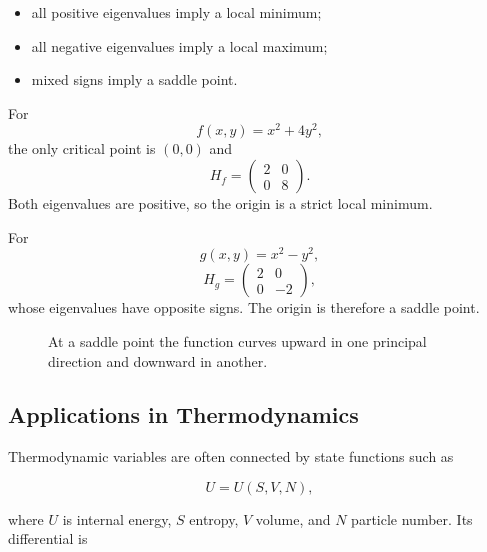 \begin{itemize}
\item all positive eigenvalues imply a local minimum;
\item all negative eigenvalues imply a local maximum;
\item mixed signs imply a saddle point.
\end{itemize}

\begin{bookexample}
For
\[
f(x,y)=x^2+4y^2,
\]
the only critical point is $(0,0)$ and
\[
H_f=
\begin{pmatrix}
2&0\\0&8
\end{pmatrix}.
\]
Both eigenvalues are positive, so the origin is a strict local minimum.

For
\[
g(x,y)=x^2-y^2,
\]
\[
H_g=
\begin{pmatrix}
2&0\\0&-2
\end{pmatrix},
\]
whose eigenvalues have opposite signs. The origin is therefore a saddle point.
\end{bookexample}

\begin{figure}[htbp]
\centering
{}
\caption{At a saddle point the function curves upward in one principal direction and downward in another.}
\label{fig:hessian-saddle}
\end{figure}

\subsection{Applications in Thermodynamics}

Thermodynamic variables are often connected by state functions such as

\[
U=U(S,V,N),
\]

where $U$ is internal energy, $S$ entropy, $V$ volume, and $N$ particle number. Its differential is

